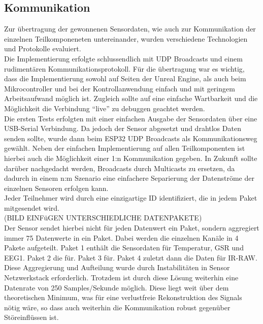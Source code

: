 \subsection{Kommunikation} \label{grund-kommunikation}


Zur {\"u}bertragung der gewonnenen Sensordaten, wie auch zur Kommunikation der einzelnen Teilkomponeneten untereinander, wurden verschiedene Technologien und Protokolle evaluiert. \\

Die Implementierung erfolgte schlussendlich mit UDP Broadcasts und einem rudiment{\"a}ren Kommunikationsprotokoll.
F{\"u}r die {\"u}bertragung war es wichtig, dass die Implementierung sowohl auf Seiten der Unreal Engine, als auch beim Mikrocontroller und bei der Kontrollanwendung einfach und mit geringem Arbeitsaufwand m{\"o}glich ist.
Zugleich sollte auf eine einfache Wartbarkeit und die M{\"o}glichkeit die Verbindung ``live'' zu debuggen geachtet werden. \\

Die ersten Tests erfolgten mit einer einfachen Ausgabe der Sensordaten {\"u}ber eine USB-Serial Verbindung.
Da jedoch der Sensor abgesetzt und drahtlos Daten senden sollte, wurde dann beim ESP32 UDP Broadcasts als Kommunikationsweg gew{\"a}hlt. Neben der einfachen Implementierung auf allen Teilkomponenten ist hierbei auch die M{\"o}glichkeit einer 1:n Kommunikation gegeben.
In Zukunft sollte dar{\"u}ber nachgedacht werden, Broadcasts durch Multicasts zu ersetzen, da dadurch in einem n:m Szenario eine einfachere Separierung der Datenstr{\"o}me der einzelnen Sensoren erfolgen kann. \\

Jeder Teilnehmer wird durch eine einzigartige ID identifiziert, die in jedem Paket mitgesendet wird. \\

(BILD EINF{\"u}GEN UNTERSCHIEDLICHE DATENPAKETE) \\

Der Sensor sendet hierbei nicht f{\"u}r jeden Datenwert ein Paket, sondern aggregiert immer 75 Datenwerte in ein Paket. Dabei werden die einzelnen Kan{\"a}le in 4 Pakete aufgeteilt.
Paket 1 enth{\"a}lt die Sensordaten f{\"u}r Temperatur, GSR und EEG1. 
Paket 2 die f{\"u}r. 
Paket 3 f{\"u}r. 
Paket 4 zuletzt dann die Daten f{\"u}r IR-RAW. Diese Aggregierung und Aufteilung wurde durch Instabilit{\"a}ten in Sensor Netzwerkstack erforderlich.
Trotzdem ist durch diese L{\"o}sung weiterhin eine Datenrate von 250 Samples/Sekunde m{\"o}glich. Diese liegt weit {\"u}ber dem theoretischen Minimum, was f{\"u}r eine verlustfreie Rekonstruktion des Signals n{\"o}tig w{\"a}re, so dass auch weiterhin die Kommunikation robust gegen{\"u}ber St{\"o}reinfl{\"u}ssen ist.